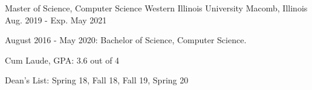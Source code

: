 \begin{cventries}
  \cventry
    {Master of Science, Computer Science}%
    {Western Illinois University} %
    {Macomb, Illinois} %
    {Aug. 2019 - Exp. May 2021} %
    {
      \begin{cvitems} %
        \item {August 2016 - May 2020: Bachelor of Science, Computer Science.}
        \item {Cum Laude, GPA: 3.6 out of 4}
        \item {Dean's List: Spring 18, Fall 18, Fall 19, Spring 20}
      \end{cvitems}
    }
    
\end{cventries}
